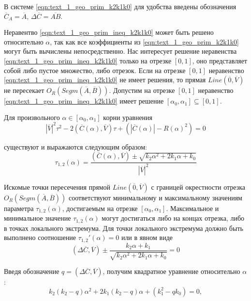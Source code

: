 В системе \eqref{eqn:text_1_geo_prim_k2k1k0} для удобства введены обозначения $\overline{C}_A = \overline{A}$, $\Delta \overline{C} = \overline{AB}$.

Неравентво \eqref{eqn:text_1_geo_prim_ineq_k2k1k0} может быть решено относительно $\alpha$, так как все коэффициенты из \eqref{eqn:text_1_geo_prim_k2k1k0} могут быть вычислены непосредственно.
Нас интересует решение неравенства \eqref{eqn:text_1_geo_prim_ineq_k2k1k0} только на отрезке $[0,1]$, оно представляет собой либо пустое множество, либо отрезок.
Если на отрезке $[0,1]$ неравенство \eqref{eqn:text_1_geo_prim_ineq_k2k1k0} не имеет решения, то прямая $Line(\overline{0}, \overline{V})$ не пересекает $O_R(Segm(\overline{A}, \overline{B}))$.
Допустим на отрезке $[0,1]$ неравенство \eqref{eqn:text_1_geo_prim_ineq_k2k1k0} имеет решение $[\alpha_0, \alpha_1] \subseteq [0, 1]$.
 
Для произвольного $\alpha \in [\alpha_0, \alpha_1]$ корни уравнения
\begin{equation}
	|\overline{V}|^2 \tau^2 - 2(\overline{C}(\alpha), \overline{V}) \tau + \left( |\overline{C}(\alpha)| - R(\alpha)^2 \right) = 0
\end{equation}

существуют и выражаются следующим образом:
\begin{equation}
	\tau_{1,2}(\alpha) = \frac{(\overline{C}(\alpha), \overline{V}) \pm \sqrt{k_2 \alpha^2 + 2 k_1 \alpha + k_0}}{|\overline{V}|^2}
\end{equation}

Искомые точки пересечения прямой $Line(\overline{0}, \overline{V})$ с границей окрестности отрезка $O_R(Segm(\overline{A}, \overline{B}))$ соответствуют минимальному и максимальному значениям параметра $\tau_{1,2}(\alpha)$, достигаемым на отрезке $[\alpha_0, \alpha_1]$.
Максимальное и минимальное значение $\tau_{1,2}(\alpha)$ могут достигаться либо на концах отрезка, либо в точках локального экстремума.
Для точки локального экстремума должно быть выполнено соотношение $\tau_{1,2}'(\alpha) = 0$ или в явном виде
\begin{equation}
	(\Delta \overline{C}, \overline{V}) \pm \frac{k_2 \alpha + k_1}{ \sqrt{k_2 \alpha^2 + 2 k_1 \alpha + k_0} } = 0
\end{equation}

Введя обозначение $q = (\Delta \overline{C}, \overline{V})$, получим квадратное уравнение относительно $\alpha$:
\begin{equation}
	k_2 (k_2 - q) \alpha^2 + 2 k_1 (k_2 - q) \alpha + (k_1^2 - q k_0) = 0,
\end{equation}


